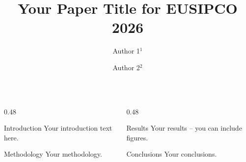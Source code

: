 \documentclass[english, xcolor=table]{beamer}
\title{Your Paper Title for EUSIPCO 2026}
\author{Author 1$^{1}$ \and Author 2$^{2}$}
\institute{$^{1}$KU Leuven, $^{2}$Other University}
\begin{document}
\begin{frame}
  \begin{columns}[t, totalwidth=\linewidth]
    \begin{column}{0.48\linewidth}
      \begin{block}{Introduction}
        Your introduction text here.
      \end{block}

      \begin{block}{Methodology}
        Your methodology.
      \end{block}
    \end{column}

    \begin{column}{0.48\linewidth}
      \begin{block}{Results}
        Your results – you can include figures.
      \end{block}

      \begin{block}{Conclusions}
        Your conclusions.
      \end{block}
    \end{column}
  \end{columns}
\end{frame}
\end{document}
